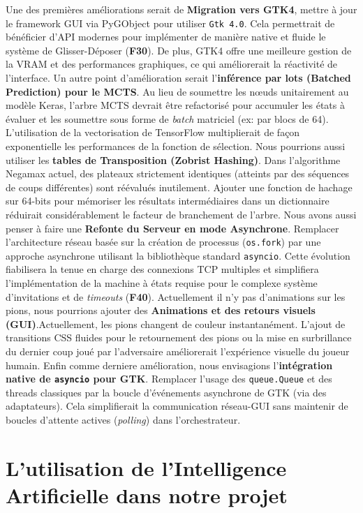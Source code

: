 \documentclass[a4paper]{article}
\begin{document}
Une des premières améliorations serait de \textbf{Migration vers GTK4}, mettre à jour le framework GUI via PyGObject pour utiliser \texttt{Gtk 4.0}. 
Cela permettrait de bénéficier d'API modernes pour implémenter de manière native et fluide le système de Glisser-Déposer (\textbf{F30}). 
De plus, GTK4 offre une meilleure gestion de la VRAM et des performances graphiques, ce qui améliorerait la réactivité de l'interface.
Un autre point d'amélioration serait l'\textbf{inférence par lots (Batched Prediction) pour le MCTS}. Au lieu de soumettre les nœuds unitairement au modèle Keras, 
l'arbre MCTS devrait être refactorisé pour accumuler les états à évaluer et les soumettre sous forme de \textit{batch} matriciel (ex: par blocs de 64). 
L'utilisation de la vectorisation de TensorFlow multiplierait de façon exponentielle les performances de la fonction de sélection.
Nous pourrions aussi utiliser les \textbf{tables de Transposition (Zobrist Hashing)}. Dans l'algorithme Negamax actuel, 
des plateaux strictement identiques (atteints par des séquences de coups différentes) sont réévalués inutilement. 
Ajouter une fonction de hachage sur 64-bits pour mémoriser les résultats intermédiaires dans un dictionnaire réduirait considérablement le facteur de branchement de l'arbre.
Nous avons aussi penser à faire une \textbf{Refonte du Serveur en mode Asynchrone}.
Remplacer l'architecture réseau basée sur la création de processus (\texttt{os.fork}) par une approche asynchrone utilisant la bibliothèque standard \texttt{asyncio}. 
Cette évolution fiabilisera la tenue en charge des connexions TCP multiples et simplifiera l'implémentation de la machine à états requise pour le complexe système 
d'invitations et de \textit{timeouts} (\textbf{F40}).
Actuellement il n'y pas d'animations sur les pions, nous pourrions ajouter des \textbf{Animations et des retours visuels (GUI)}.Actuellement, les pions changent de couleur instantanément. 
L'ajout de transitions CSS fluides pour le retournement des pions ou la mise en surbrillance du dernier coup joué par l'adversaire améliorerait
 l'expérience visuelle du joueur humain.
Enfin comme derniere amélioration, nous envisagions l'\textbf{intégration native de \texttt{asyncio} pour GTK}. Remplacer l'usage des \texttt{queue.Queue} 
et des threads classiques par la boucle d'événements asynchrone de GTK (via des adaptateurs). 
Cela simplifierait la communication réseau-GUI sans maintenir de boucles d'attente actives (\textit{polling}) dans l'orchestrateur.


\section{L'utilisation de l'Intelligence Artificielle dans notre projet}
\end{document}
